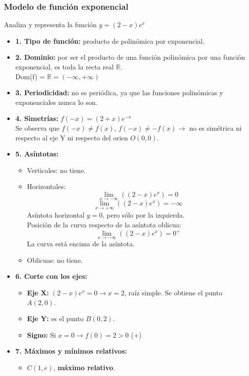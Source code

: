 \subsubsection{Modelo de función exponencial}
Analiza y representa la función $y=(2-x)e^x$
\begin{itemize}
	\item \textbf{1. Tipo de función: }producto de polinómica por exponencial.
	\item \textbf{2. Dominio: }por ser el producto de una función polinómica por una función exponencial, es toda la recta real $\mathbb{R}$.\\
	Dom(f) = $\mathbb{R}=(-\infty, +\infty)$
	\item \textbf{3. Periodicidad: }no es periódica, ya que las funciones polinómicas y exponenciales nunca lo son.
	\item \textbf{4. Simetrías: }$f(-x)=(2+x)e^{-x}$\\
	Se observa que $f(-x)\neq f(x)$, $f(-x) \neq -f(x) \rightarrow$ no es simétrica ni respecto al eje Y ni respecto del orien $O(0,0)$.
	\item \textbf{5. Asíntotas: }\\
	\begin{itemize}
		\item Verticales: no tiene.
		\item Horizontales: \\
		$$\lim_{x \to -\infty}((2-x)e^x)=0$$
		$$\lim_{x \to +\infty}((2-x)e^x)=-\infty$$
		Asíntota horizontal $y=0$, pero sólo por la izquierda.\\
		Posición de la curva respecto de la asíntota oblicua:
		$$\lim_{x \to -\infty}((2-x)e^x)=0^{+}$$
		La curva está encima de la asíntota.
		\item Oblicuas: no tiene.
	\end{itemize}
	\item \textbf{6. Corte con los ejes: }
	\begin{itemize}
		\item \textbf{Eje X: }$(2-x)e^{x} = 0 \rightarrow x=2$, raíz simple. Se obtiene el punto $A(2,0)$.
		\item \textbf{Eje Y: }es el punto $B(0,2)$.
		\item \textbf{Signo: }Si $x=0 \rightarrow f(0)=2>0$ (+)
	\end{itemize}
	\item \textbf{7. Máximos y mínimos relativos: }\\
	\begin{itemize}
		\item $C(1,e)$, \textbf{máximo relativo}.\\

\end{itemize}
\end{itemize}
